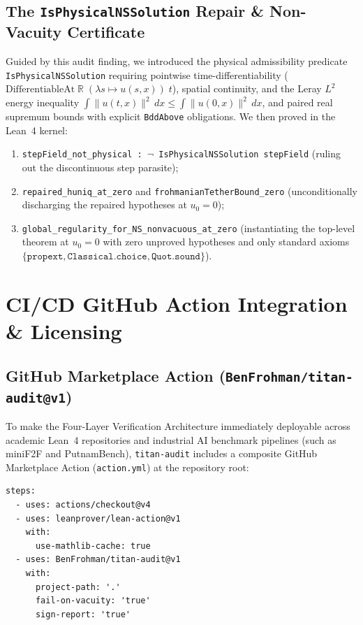 \documentclass[11pt,a4paper]{article}
\theoremstyle{plain}
\theoremstyle{definition}
\begin{document}
\subsection{The \texttt{IsPhysicalNSSolution} Repair \& Non-Vacuity Certificate}

Guided by this audit finding, we introduced the physical admissibility predicate \texttt{IsPhysicalNSSolution} requiring pointwise time-differentiability ($\mathrm{DifferentiableAt}\;\mathbb{R}\;(\lambda s \mapsto u(s,x))\;t$), spatial continuity, and the Leray $L^2$ energy inequality $\int \|u(t,x)\|^2\,dx \le \int \|u(0,x)\|^2\,dx$, and paired real supremum bounds with explicit \texttt{BddAbove} obligations. We then proved in the Lean~4 kernel:
\begin{enumerate}[nosep]
  \item \texttt{stepField\_not\_physical : $\neg$ IsPhysicalNSSolution stepField} (ruling out the discontinuous step parasite);
  \item \texttt{repaired\_huniq\_at\_zero} and \texttt{frohmanianTetherBound\_zero} (unconditionally discharging the repaired hypotheses at $u_0 = 0$);
  \item \texttt{global\_regularity\_for\_NS\_nonvacuous\_at\_zero} (instantiating the top-level theorem at $u_0 = 0$ with zero unproved hypotheses and only standard axioms $\{\texttt{propext}, \texttt{Classical.choice}, \texttt{Quot.sound}\}$).
\end{enumerate}

\section{CI/CD GitHub Action Integration \& Licensing}\label{sec:cicd}

\subsection{GitHub Marketplace Action (\texttt{BenFrohman/titan-audit@v1})}

To make the Four-Layer Verification Architecture immediately deployable across academic Lean~4 repositories and industrial AI benchmark pipelines (such as miniF2F and PutnamBench), \texttt{titan-audit} includes a composite GitHub Marketplace Action (\texttt{action.yml}) at the repository root:

\begin{lstlisting}[caption={Drop-in GitHub Actions workflow using \texttt{BenFrohman/titan-audit@v1}.}]
steps:
  - uses: actions/checkout@v4
  - uses: leanprover/lean-action@v1
    with:
      use-mathlib-cache: true
  - uses: BenFrohman/titan-audit@v1
    with:
      project-path: '.'
      fail-on-vacuity: 'true'
      sign-report: 'true'
\end{lstlisting}
\end{document}
